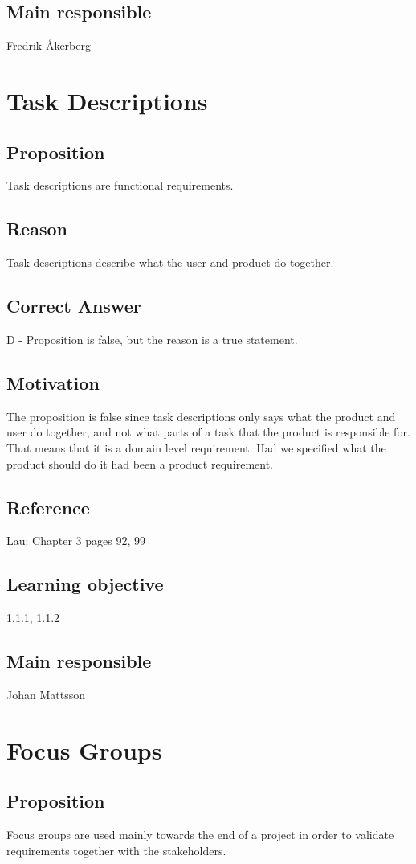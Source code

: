 \documentclass[a4paper]{article}
\begin{document}
\subsection*{Main responsible}
Fredrik Åkerberg


\section{Task Descriptions}
\subsection*{Proposition}
Task descriptions are functional requirements.
\subsection*{Reason}
Task descriptions describe what the user and product do together.
\subsection*{Correct Answer}
D - Proposition is false, but the reason is a true statement.
\subsection*{Motivation}
The proposition is false since task descriptions only says what the product and user do together, and not what parts of a task that the product is responsible for. That means that it is a domain level requirement. Had we specified what the product should do it had been a product requirement.
\subsection*{Reference}
Lau: Chapter 3 pages 92, 99
\subsection*{Learning objective}
1.1.1, 1.1.2
\subsection*{Main responsible}
Johan Mattsson


\section{Focus Groups}
\subsection*{Proposition}
Focus groups are used mainly towards the end of a project in order to validate requirements together with the stakeholders.
\end{document}
